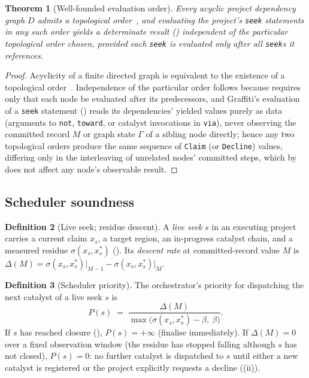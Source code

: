 \documentclass[11pt,twocolumn,a4paper]{article}
\theoremstyle{thmstyle}
\newtheorem{theorem}{Theorem}[section]
\theoremstyle{definition}
\newtheorem{definition}[theorem]{Definition}
\theoremstyle{remark}
\newcommand{\Gph}{\Gamma}
\newcommand{\flo}{\beta}
\newcommand{\rec}{M}
\newcommand{\str}{\sigma}
\begin{document}
\begin{theorem}[Well-founded evaluation order]
\label{thm:dag-order}
Every acyclic project dependency graph $D$ admits a topological
order~\citep{cormen2009introduction}, and evaluating the project's
\texttt{seek} statements in any such order yields a determinate result
() independent of the particular topological order
chosen, provided each \texttt{seek} is evaluated only after all
\texttt{seek}s it references.
\end{theorem}

\begin{proof}
Acyclicity of a finite directed graph is equivalent to the existence of a
topological order~\citep{cormen2009introduction}. Independence of the
particular order follows because  requires only that
each node be evaluated after its predecessors, and Graffiti's evaluation
of a \texttt{seek} statement ()
reads its dependencies' yielded values purely as data (arguments to
\texttt{not}, \texttt{toward}, or catalyst invocations in \texttt{via}),
never observing the committed record $\rec$ or graph state $\Gph$ of a
sibling node directly; hence any two topological orders produce the same
sequence of \texttt{Claim} (or \texttt{Decline}) values, differing only in
the interleaving of unrelated nodes' committed steps, which by
 does not affect any node's observable
result.
\end{proof}

\subsection{Scheduler soundness}

\begin{definition}[Live seek; residue descent]
\label{def:live-seek}
A \emph{live seek} $s$ in an executing project carries a current claim
$x_s$, a target region, an in-progress catalyst chain, and a measured
residue $\str(x_s,x^{\ast}_s)$ (). Its \emph{descent
rate} at committed-record value $\rec$ is
$\Delta(\rec)=\str(x_s,x^{\ast}_s)\rvert_{\rec-1} -
\str(x_s,x^{\ast}_s)\rvert_{\rec}$.
\end{definition}

\begin{definition}[Scheduler priority]
\label{def:scheduler-priority}
The orchestrator's priority for dispatching the next catalyst of a live
seek $s$ is
\[
P(s) \;=\; \frac{\Delta(\rec)}{\max\bigl(\str(x_s,x^{\ast}_s)-\flo,\ \flo\bigr)}.
\]
If $s$ has reached closure (), $P(s)=+\infty$ (finalise
immediately). If $\Delta(\rec)=0$ over a fixed observation window (the
residue has stopped falling although $s$ has not closed), $P(s)=0$: no
further catalyst is dispatched to $s$ until either a new catalyst is
registered or the project explicitly requests a decline
((ii)).
\end{definition}
\end{document}
